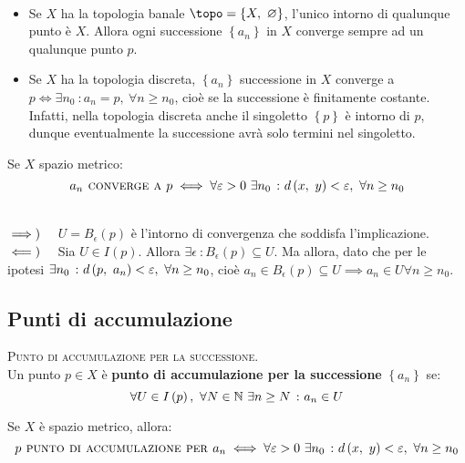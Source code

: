 \begin{examples}~{}
	\begin{itemize}
		\item Se $X$ ha la topologia banale $\topo=\left\{X,\ \emptyset\right\}$, l'unico intorno di qualunque punto è $X$. Allora ogni successione $\left\{a_n\right\}$ in $X$ converge sempre ad un qualunque punto $p$.
		\item Se $X$ ha la topologia discreta, $\left\{a_n\right\}$ successione in $X$ converge a $p\iff \exists n_0\ \colon a_n=p,\ \forall n\geq n_0$, cioè se la successione è finitamente costante. Infatti, nella topologia discreta anche il singoletto $\left\{p\right\}$ è intorno di $p$, dunque eventualmente la successione avrà solo termini nel singoletto.
	\end{itemize}
\vspace{-3mm}
\end{examples}
\begin{observe}
Se $X$ spazio metrico:
\begin{equation}
	a_n\textsc{ converge a } p\iff \forall \varepsilon>0\ \exists n_0\ \colon d\left(x,\ y\right)<\varepsilon,\ \forall n\geq n_0
\end{equation}
\vspace{-6mm}
\end{observe}
\begin{demonstration}~{}\\
	$\implies)\quad$ $U=B_{\epsilon}\left(p\right)$ è l'intorno di convergenza che soddisfa l'implicazione.\\
	$\impliedby)\quad$ Sia $U\in I\left(p\right)$. Allora $\exists \epsilon\ \colon B_{\epsilon}\left(p\right)\subseteq U$. Ma allora, dato che per le ipotesi $\exists n_0\ \colon d\left(p,\ a_n\right)<\varepsilon,\ \forall n\geq n_0$, cioè $a_n\in B_{\epsilon}\left(p\right)\subseteq U\implies a_n\in U\forall n\geq n_0$.
\end{demonstration}
\subsection{Punti di accumulazione}
\begin{define}\textsc{Punto di accumulazione per la successione.}\\
	Un punto $p\in X$ è \textbf{punto di accumulazione per la successione} $\left\{a_n\right\}$ se:
	\begin{equation}
		\forall U\in I\left(p\right),\ \forall N\in\mathbb{N}\ \exists n\geq N\ \colon a_n\in U
	\end{equation}
\vspace{-6mm}
\end{define}
\begin{exercise}
	Se $X$ è spazio metrico, allora:
	\begin{equation}
		p\textsc{ punto di accumulazione per } a_n\iff \forall \epsilon>0\ \exists n_0\ \colon \mvf{d}{x}{y}<\epsilon,\ \forall n\geq n_0
	\end{equation}
\vspace{-6mm}
\end{exercise}

